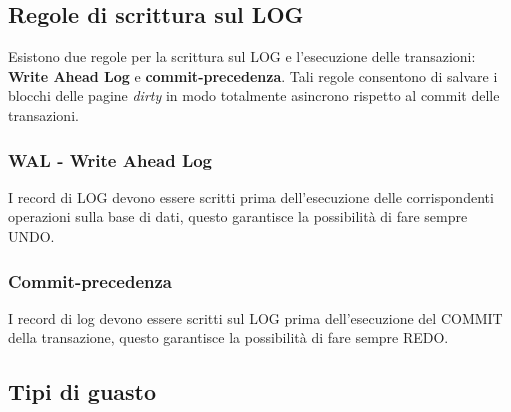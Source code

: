 \documentclass[11pt]{report}
\begin{document}
\subsection{Regole di scrittura sul LOG}

Esistono due regole per la scrittura sul LOG e l'esecuzione delle transazioni: \textbf{Write Ahead Log} e \textbf{commit-precedenza}. Tali regole consentono di salvare i blocchi delle pagine \emph{dirty} in modo totalmente asincrono rispetto al commit delle transazioni.

\subsubsection{WAL - Write Ahead Log}
I record di LOG devono essere scritti prima dell'esecuzione delle corrispondenti operazioni sulla base di dati, questo garantisce la possibilit\`a di fare sempre UNDO.

\subsubsection{Commit-precedenza}
I record di log devono essere scritti sul LOG prima dell'esecuzione del COMMIT della transazione, questo garantisce la possibilit\`a di fare sempre REDO.

\subsection{Tipi di guasto}

\begin{center}
\end{center}
\end{document}
